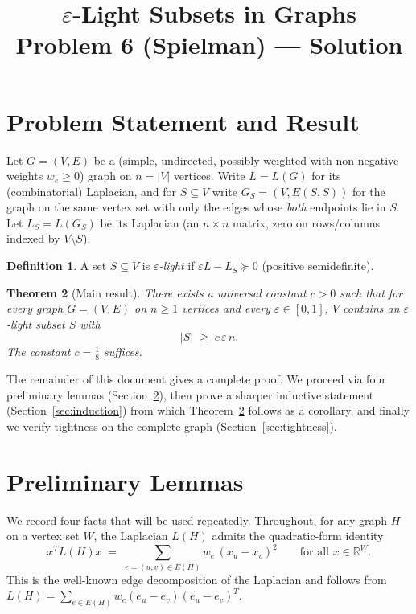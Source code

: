 \documentclass[12pt]{article}
\title{$\varepsilon$-Light Subsets in Graphs \\
\large Problem 6 (Spielman) --- Solution}
\author{}
\date{}
\newtheorem{theorem}{Theorem}
\theoremstyle{definition}
\newtheorem{definition}[theorem]{Definition}
\begin{document}
\maketitle

\section{Problem Statement and Result}

Let $G=(V,E)$ be a (simple, undirected, possibly weighted with non-negative weights $w_e \ge 0$) graph on $n=|V|$ vertices.  Write $L=L(G)$ for its (combinatorial) Laplacian, and for $S\subseteq V$ write $G_S = (V, E(S,S))$ for the graph on the same vertex set with only the edges whose \emph{both} endpoints lie in $S$.  Let $L_S = L(G_S)$ be its Laplacian (an $n\times n$ matrix, zero on rows/columns indexed by $V\setminus S$).

\begin{definition}\label{def:light}
A set $S\subseteq V$ is \emph{$\varepsilon$-light} if $\varepsilon L - L_S \succeq 0$ (positive semidefinite).
\end{definition}

\begin{theorem}[Main result]\label{thm:main}
There exists a universal constant $c>0$ such that for every graph $G=(V,E)$ on $n\ge 1$ vertices and every $\varepsilon\in[0,1]$, $V$ contains an $\varepsilon$-light subset $S$ with
\[
|S| \;\ge\; c\,\varepsilon\,n.
\]
The constant $c=\tfrac18$ suffices.
\end{theorem}

The remainder of this document gives a complete proof.  We proceed via four preliminary lemmas (Section~\ref{sec:lemmas}), then prove a sharper inductive statement (Section~\ref{sec:induction}) from which Theorem~\ref{thm:main} follows as a corollary, and finally we verify tightness on the complete graph (Section~\ref{sec:tightness}).

\section{Preliminary Lemmas}\label{sec:lemmas}

We record four facts that will be used repeatedly.  Throughout, for any graph $H$ on a vertex set $W$, the Laplacian $L(H)$ admits the quadratic-form identity
\begin{equation}\label{eq:quadratic}
x^T L(H) x \;=\; \sum_{e=(u,v)\in E(H)} w_e\,(x_u-x_v)^2 \qquad\text{for all }x\in\mathbb{R}^W.
\end{equation}
This is the well-known edge decomposition of the Laplacian and follows from $L(H)=\sum_{e\in E(H)} w_e (e_u-e_v)(e_u-e_v)^T$.
\end{document}
